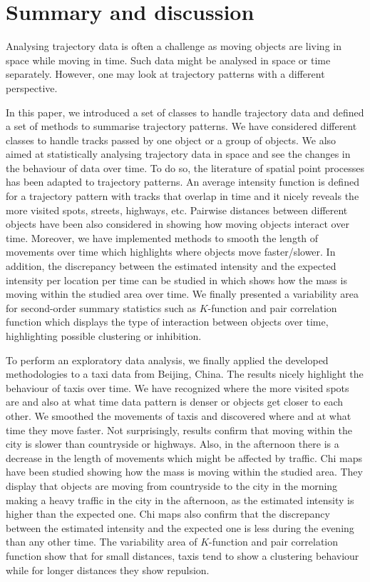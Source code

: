 \documentclass[article]{jss}
\begin{document}
 \section{Summary and discussion} \label{sec:summary}
  Analysing trajectory data is often a challenge as moving objects are living in space while moving in time. Such data might be analysed in space or time separately. However, one may look at trajectory patterns with a different perspective. 
  
  In this paper, we introduced a set of classes to handle trajectory data and defined a set of methods to summarise trajectory patterns. We have considered different classes to handle tracks passed by one object or a group of objects. We also aimed at statistically analysing trajectory data in space and see the changes in the behaviour of data over time. To do so, the literature of spatial point processes has been adapted to trajectory patterns. An average intensity function is defined for a trajectory pattern with tracks that overlap in time and it nicely reveals the more visited spots, streets, highways, etc. Pairwise distances between different objects have been also considered in  showing how moving objects interact over time. Moreover, we have implemented methods to smooth the length of movements over time which highlights where objects move faster/slower. In addition, the discrepancy between the estimated intensity and the expected intensity per location per time can be studied in  which shows how the mass is moving within the studied area over time. We finally presented a variability area for second-order summary statistics such as $K$-function and pair correlation function which displays the type of interaction between objects over time, highlighting possible clustering or inhibition.
  
  To perform an exploratory data analysis, we finally applied the developed methodologies to a taxi data from Beijing, China. The results nicely highlight the behaviour of taxis over time. We have recognized where the more visited spots are and also at what time data pattern is denser or objects get closer to each other. We smoothed the movements of taxis and discovered where and at what time they move faster. Not surprisingly, results confirm that moving within the city is slower than countryside or highways. Also, in the afternoon there is a decrease in the length of movements which might be affected by traffic. Chi maps have been studied showing how the mass is moving within the studied area. They display that objects are moving from countryside to the city in the morning making a heavy traffic in the city in the afternoon, as the estimated intensity is higher than the expected one. Chi maps also confirm that the  discrepancy between the estimated intensity and the expected one is less during the evening than any other time. The variability area of $K$-function and pair correlation function show that for small distances, taxis tend to show a clustering behaviour while for longer distances they show repulsion.
  
\end{document}
